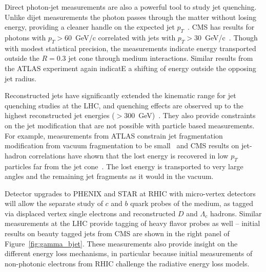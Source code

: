 
Direct photon-jet measurements are also a powerful tool to study jet
quenching. Unlike dijet measurements the photon passes through the
matter without losing energy, providing a cleaner handle on the
expected jet $p_T$~\cite{Wang:1996yh}.  CMS has results for
photons with $p_T>60$~GeV/c correlated with jets with
$p_T>30$~GeV/c~\cite{Chatrchyan:2012}.  Though with modest
statistical precision, the measurements indicate energy transported
outside the $R=0.3$ jet cone through medium interactions.  
Similar results from the ATLAS experiment 
again indicatE a shifting of energy outside the opposing jet radius.

Reconstructed jets have
significantly extended the kinematic range for jet quenching studies
at the LHC, and quenching effects are observed up to the highest
reconstructed jet energies ($>300$~GeV)~\cite{Chatrchyan:2012ni}.
They also provide constraints on the jet modification that are not
possible with particle based measurements.  For example, measurements from ATLAS
constrain jet fragmentation modification from vacuum fragmentation to
be small~\cite{Steinberg:2011qq} and  CMS results on jet-hadron
correlations have shown that the lost energy is recovered in low $p_T$
particles far from the jet cone~\cite{Chatrchyan:2011sx}.  
The lost energy is transported to very large angles
and the remaining jet fragments as it would in the vacuum.

Detector upgrades to PHENIX and STAR at RHIC with micro-vertex detectors will
allow the separate study of $c$ and $b$ quark probes of the medium, as tagged
via displaced vertex single electrons and reconstructed $D$ and $\Lambda_{c}$ hadrons.   Similar 
measurements at the LHC provide tagging of heavy flavor probes as well -- initial
results on beauty tagged jets from CMS are shown in the right panel of Figure~\ref{fig:gamma_bjet}.  
These measurements also provide insight on the different energy loss mechanisms,
in particular because initial measurements of non-photonic electrons from RHIC
challenge the radiative energy loss models.

